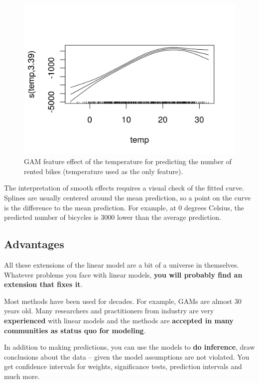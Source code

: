 \documentclass[12pt,]{krantz}
\begin{document}
\begin{figure}

{\centering \includegraphics[width=\textwidth]{images/splines-curve-1} 

}

\caption{GAM feature effect of the temperature for predicting the number of rented bikes (temperature used as the only feature).}\label{fig:splines-curve}
\end{figure}

The interpretation of smooth effects requires a visual check of the
fitted curve. Splines are usually centered around the mean prediction,
so a point on the curve is the difference to the mean prediction. For
example, at 0 degrees Celsius, the predicted number of bicycles is 3000
lower than the average prediction.

\subsection{Advantages}\label{advantages-1}

All these extensions of the linear model are a bit of a universe in
themselves. Whatever problems you face with linear models, \textbf{you
will probably find an extension that fixes it}.

Most methods have been used for decades. For example, GAMs are almost 30
years old. Many researchers and practitioners from industry are very
\textbf{experienced} with linear models and the methods are
\textbf{accepted in many communities as status quo for modeling}.

In addition to making predictions, you can use the models to \textbf{do
inference}, draw conclusions about the data -- given the model
assumptions are not violated. You get confidence intervals for weights,
significance tests, prediction intervals and much more.
\end{document}
